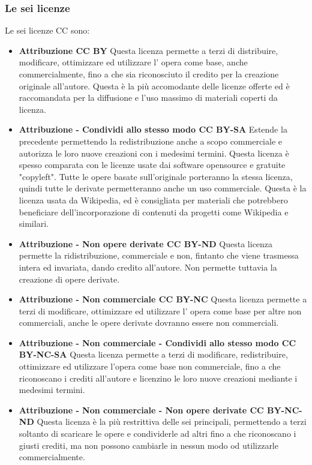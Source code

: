 \subsubsection{Le sei licenze}
Le sei licenze CC sono:
\begin{itemize}
\item \textbf{Attribuzione CC BY} Questa licenza permette a terzi di distribuire, modificare, ottimizzare ed utilizzare l' opera come base, anche commercialmente, fino a che sia riconosciuto il credito per la creazione originale all'autore. Questa è la più accomodante delle licenze offerte ed è raccomandata per la diffusione e l'uso massimo di materiali coperti da licenza.
\item \textbf{Attribuzione - Condividi allo stesso modo CC BY-SA} Estende la precedente permettendo la redistribuzione anche a scopo commerciale e autorizza le loro nuove creazioni con i medesimi termini. Questa licenza è spesso comparata con le licenze usate dai software opensource e gratuite "copyleft". Tutte le opere basate sull'originale porteranno la stessa licenza, quindi tutte le derivate permetteranno anche un uso commerciale. Questa è la licenza usata da Wikipedia, ed è consigliata per materiali che potrebbero beneficiare dell'incorporazione di contenuti da progetti come Wikipedia e similari.
\item \textbf{Attribuzione - Non opere derivate CC BY-ND} Questa licenza permette la ridistribuzione, commerciale e non, fintanto che viene trasmessa intera ed invariata, dando credito all'autore. Non permette tuttavia la creazione di opere derivate.
\item \textbf{Attribuzione - Non commerciale CC BY-NC} Questa licenza permette a terzi di modificare, ottimizzare ed utilizzare l' opera come base per altre non commerciali, anche le opere derivate dovranno essere non commerciali.
\item \textbf{Attribuzione - Non commerciale - Condividi allo stesso modo CC BY-NC-SA} Questa licenza permette a terzi di modificare, redistribuire, ottimizzare ed utilizzare l'opera come base non commerciale, fino a che riconoscano i crediti all'autore e licenzino le loro nuove creazioni mediante i medesimi termini.
\item \textbf{Attribuzione - Non commerciale - Non opere derivate 
CC BY-NC-ND} Questa licenza è la più restrittiva delle sei principali, permettendo a terzi soltanto di scaricare le opere e condividerle ad altri fino a che riconoscano i giusti crediti, ma non possono cambiarle in nessun modo od utilizzarle commercialmente.
\end{itemize}

